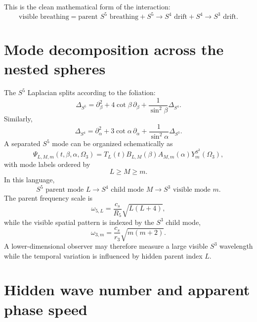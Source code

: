 \documentclass[11pt]{article}
\begin{document}
This is the clean mathematical form of the interaction:
\begin{equation}
\boxed{\text{visible breathing} = \text{parent }S^5\text{ breathing} + S^5\rightarrow S^4\text{ drift} + S^4\rightarrow S^3\text{ drift}.}
\end{equation}

\section{Mode decomposition across the nested spheres}

The $S^5$ Laplacian splits according to the foliation:
\begin{equation}
 \Delta_{S^5}
 =\partial_\beta^2+4\cot\beta\,\partial_\beta
 +\frac{1}{\sin^2\beta}\Delta_{S^4}.
 \label{eq:s5-laplacian-split}
\end{equation}
Similarly,
\begin{equation}
 \Delta_{S^4}
 =\partial_\alpha^2+3\cot\alpha\,\partial_\alpha
 +\frac{1}{\sin^2\alpha}\Delta_{S^3}.
 \label{eq:s4-laplacian-split}
\end{equation}
A separated $S^5$ mode can be organized schematically as
\begin{equation}
 \Psi_{L,M,m}(t,\beta,\alpha,\Omega_3)
 =T_L(t)B_{L,M}(\beta)A_{M,m}(\alpha)Y_m^{S^3}(\Omega_3),
 \label{eq:s5-mode-decomposition}
\end{equation}
with mode labels ordered by
\begin{equation}
 L\ge M\ge m.
\end{equation}
In this language,
\begin{equation}
 S^5\text{ parent mode }L
 \rightarrow
 S^4\text{ child mode }M
 \rightarrow
 S^3\text{ visible mode }m.
\end{equation}
The parent frequency scale is
\begin{equation}
 \omega_{5,L}=\frac{c_s}{R_5}\sqrt{L(L+4)},
\end{equation}
while the visible spatial pattern is indexed by the $S^3$ child mode,
\begin{equation}
 \omega_{3,m}=\frac{c_s}{r_3}\sqrt{m(m+2)}.
\end{equation}
A lower-dimensional observer may therefore measure a large visible $S^3$ wavelength while the temporal variation is influenced by hidden parent index $L$.

\section{Hidden wave number and apparent phase speed}
\end{document}
